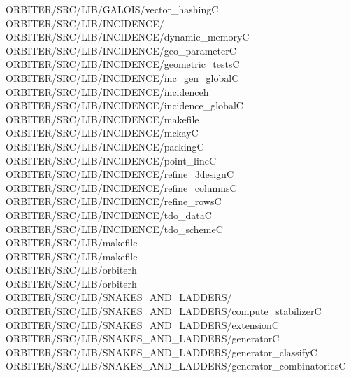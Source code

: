 \begin{tabbing}
ORBITER/SRC/LIB/GALOIS/vector\_hashingC\\[0pt]
ORBITER/SRC/LIB/INCIDENCE/\\[0pt]
ORBITER/SRC/LIB/INCIDENCE/dynamic\_memoryC\\[0pt]
ORBITER/SRC/LIB/INCIDENCE/geo\_parameterC\\[0pt]
ORBITER/SRC/LIB/INCIDENCE/geometric\_testsC\\[0pt]
ORBITER/SRC/LIB/INCIDENCE/inc\_gen\_globalC\\[0pt]
ORBITER/SRC/LIB/INCIDENCE/incidenceh\\[0pt]
ORBITER/SRC/LIB/INCIDENCE/incidence\_globalC\\[0pt]
ORBITER/SRC/LIB/INCIDENCE/makefile\\[0pt]
ORBITER/SRC/LIB/INCIDENCE/mckayC\\[0pt]
ORBITER/SRC/LIB/INCIDENCE/packingC\\[0pt]
ORBITER/SRC/LIB/INCIDENCE/point\_lineC\\[0pt]
ORBITER/SRC/LIB/INCIDENCE/refine\_3designC\\[0pt]
ORBITER/SRC/LIB/INCIDENCE/refine\_columnsC\\[0pt]
ORBITER/SRC/LIB/INCIDENCE/refine\_rowsC\\[0pt]
ORBITER/SRC/LIB/INCIDENCE/tdo\_dataC\\[0pt]
ORBITER/SRC/LIB/INCIDENCE/tdo\_schemeC\\[0pt]
ORBITER/SRC/LIB/makefile\\[0pt]
ORBITER/SRC/LIB/makefile\\[0pt]
ORBITER/SRC/LIB/orbiterh\\[0pt]
ORBITER/SRC/LIB/orbiterh\\[0pt]
ORBITER/SRC/LIB/SNAKES\_AND\_LADDERS/\\[0pt]
ORBITER/SRC/LIB/SNAKES\_AND\_LADDERS/compute\_stabilizerC\\[0pt]
ORBITER/SRC/LIB/SNAKES\_AND\_LADDERS/extensionC\\[0pt]
ORBITER/SRC/LIB/SNAKES\_AND\_LADDERS/generatorC\\[0pt]
ORBITER/SRC/LIB/SNAKES\_AND\_LADDERS/generator\_classifyC\\[0pt]
ORBITER/SRC/LIB/SNAKES\_AND\_LADDERS/generator\_combinatoricsC\\[0pt]

\end{tabbing}
